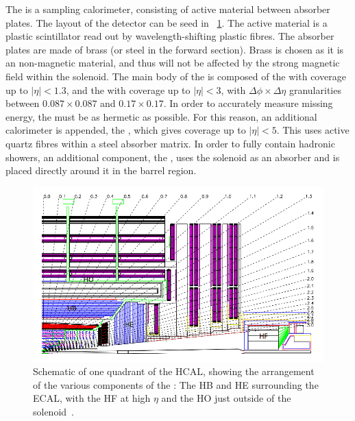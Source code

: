 The \CMS \HCAL is a sampling calorimeter, consisting of active material between absorber plates. The layout of the detector can be seed in \Fig~\ref{fig:hcal}. The active material is a plastic scintillator read out by wavelength-shifting plastic fibres. The absorber plates are made of brass (or steel in the forward section). Brass is chosen as it is an non-magnetic material, and thus will not be affected by the strong magnetic field within the solenoid. The main body of the \HCAL is composed of the \HB with coverage up to $|\eta| < 1.3$, and the \HE with coverage up to $|\eta| < 3$, with $\Delta\phi \times \Delta\eta$ granularities between $0.087 \times 0.087$ and $ 0.17 \times 0.17$. In order to accurately measure missing energy, the \HCAL must be as hermetic as possible. For this reason, an additional calorimeter is appended, the \HF, which gives coverage up to $|\eta| <5$. This uses active quartz fibres within a steel absorber matrix. In order to fully contain hadronic showers, an additional component, the \HO, uses the solenoid as an absorber and is placed directly around it in the barrel region.~\cite{cmsHcal} 

\begin{figure}[h]
\centering
\includegraphics[width=1.0\textwidth]{detectorFigures/cms_hcal.png}
\caption[Schematic \crosssection of one quadrant of the HCAL, showing the arrangement of the various components of the \subdetector: The HB and HE surrounding the ECAL, with the HF at high $\eta$ and the HO just outside of the solenoid\quad\cite{CMSatLHC}.]{Schematic \crosssection of one quadrant of the HCAL, showing the arrangement of the various components of the \subdetector: The HB and HE surrounding the ECAL, with the HF at high $\eta$ and the HO just outside of the solenoid~\cite{CMSatLHC}.}
\label{fig:hcal}
\end{figure}

